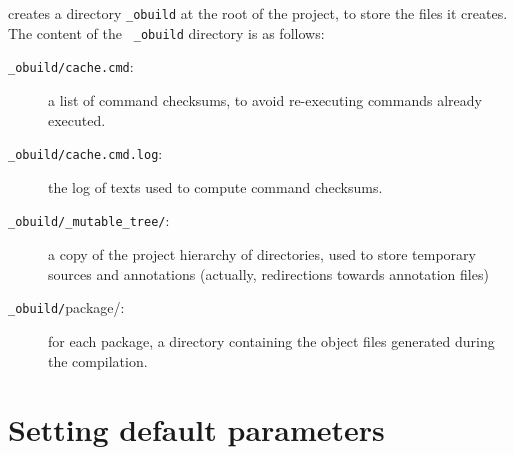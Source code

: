 \ocpbuild{} creates a directory {\tt \_obuild} at the root of the
project, to store the files it creates. The content of the {\tt
  \_obuild} directory is as follows:
\begin{description}
\item[{\tt \_obuild/cache.cmd}:] a list of command checksums, to avoid
  re-executing commands already executed.
\item[{\tt \_obuild/cache.cmd.log}:] the log of texts used to compute
  command checksums.
\item[{\tt \_obuild/\_mutable\_tree/}:] a copy of the project hierarchy
  of directories, used to store temporary sources and annotations
  (actually, redirections towards annotation files)
\item[{\tt \_obuild/}package/:] for each package, a directory
  containing the object files generated during the compilation.
\end{description}


\section{Setting \ocpbuild{} default parameters}
